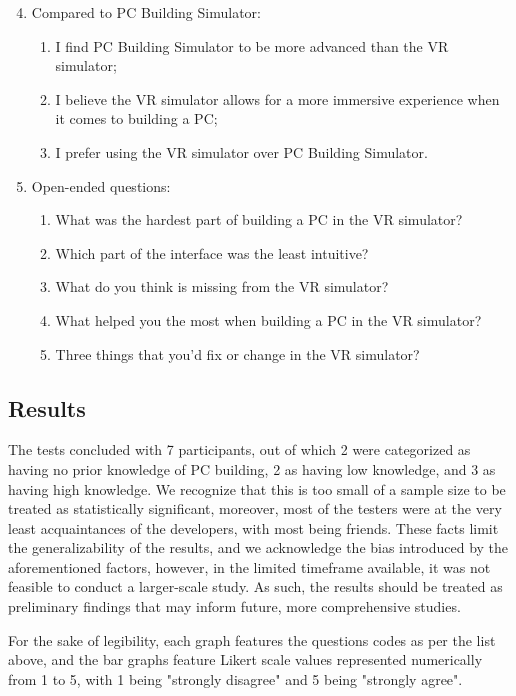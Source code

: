 \begin{enumerate}
    \setcounter{enumi}{3}
    \item Compared to PC Building Simulator:
    \begin{enumerate}
        \item I find PC Building Simulator to be more advanced than the VR simulator;
        \item I believe the VR simulator allows for a more immersive experience when it comes to building a PC;
        \item I prefer using the VR simulator over PC Building Simulator.
    \end{enumerate}
    \item Open-ended questions:
    \begin{enumerate}
        \item What was the hardest part of building a PC in the VR simulator?
        \item Which part of the interface was the least intuitive?
        \item What do you think is missing from the VR simulator?
        \item What helped you the most when building a PC in the VR simulator?
        \item Three things that you'd fix or change in the VR simulator?
    \end{enumerate}
\end{enumerate}

\subsection{Results}
\label{sec:user-testing-results}

The tests concluded with 7 participants, out of which 2 were categorized as having no prior knowledge of PC building, 2 as having low knowledge, and 3 as having high knowledge.
We recognize that this is too small of a sample size to be treated as statistically significant, moreover, most of the testers were at the very least acquaintances of the developers, with most being friends.
These facts limit the generalizability of the results, and we acknowledge the bias introduced by the aforementioned factors, however, in the limited timeframe available, it was not feasible to conduct a larger-scale study.
As such, the results should be treated as preliminary findings that may inform future, more comprehensive studies.

For the sake of legibility, each graph features the questions codes as per the list above, and the bar graphs feature Likert scale values represented numerically from 1 to 5, with 1 being "strongly disagree" and 5 being "strongly agree".

